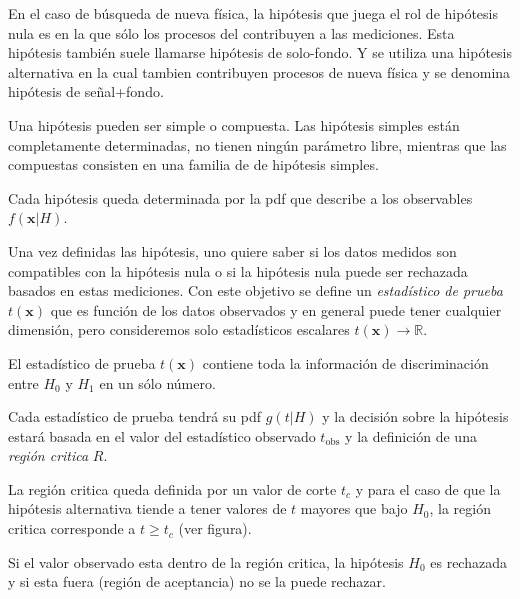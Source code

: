 En el caso de búsqueda de nueva física, la hipótesis que juega el rol de hipótesis nula es en la que
s\'olo los procesos del {\SM} contribuyen a las mediciones. Esta hipótesis también suele llamarse
hipótesis de solo-fondo. Y se utiliza una hipótesis alternativa en la cual tambien contribuyen procesos
de nueva física y se denomina hipótesis de se\~nal+fondo. 

Una hipótesis pueden ser simple o compuesta. Las hipótesis simples están completamente determinadas,
no tienen ningún parámetro libre, mientras que las compuestas consisten en una familia de de hipótesis
simples.

Cada hipótesis queda determinada por la pdf que describe a los observables $f(\bm{x}|H)$.

Una vez definidas las hipótesis, uno quiere saber si los datos medidos son compatibles con la hipótesis
nula o si la hipótesis nula puede ser rechazada basados en estas mediciones. Con este objetivo se define
un \emph{estadístico de prueba} $t(\bm{x})$ que es función de los datos observados y en general puede tener
cualquier dimensión, pero consideremos solo estadísticos escalares $t(\bm{x}) \to \mathbb{R}$.

El estadístico de prueba  $t(\bm{x})$ contiene toda la información de discriminación entre $H_0$ y $H_1$
en un s\'olo número. %

Cada estadístico de prueba tendrá su pdf $g(t|H)$ y la decisión sobre la hipótesis estará basada
en el valor del estadístico observado $t_\text{obs}$ y la definición de una \emph{región critica} $R$.

La región critica queda definida por un valor de corte $t_c$ y para el caso de que la hipótesis
alternativa tiende a tener valores de $t$ mayores que bajo $H_0$, la región critica corresponde a
$t \geq t_c$ (ver figura).

Si el valor observado esta dentro de la región critica, la hipótesis $H_0$ es rechazada y si esta
fuera (región de aceptancia) no se la puede rechazar.

\begin{figure}[h]
  \centering
  
\end{figure}



